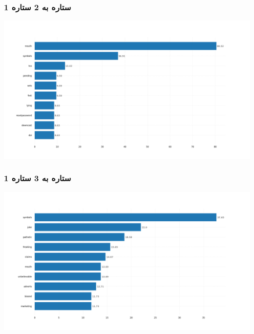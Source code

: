 \subsubsection{\Large 1 ستاره به 2 ستاره}
            { \selectfont \setLR
            \begin{center}
            \includegraphics[scale=0.4]{Images/rel_norm_freq_1_2.png}
            \end{center}
            \begin{adjustbox}{width=\textwidth}
            \end{adjustbox}
            }
\subsubsection{\Large 1 ستاره به 3 ستاره}
            { \selectfont \setLR
            \begin{center}
            \includegraphics[scale=0.4]{Images/rel_norm_freq_1_3.png}
            \end{center}
            \begin{adjustbox}{width=\textwidth}
            \end{adjustbox}
            }
